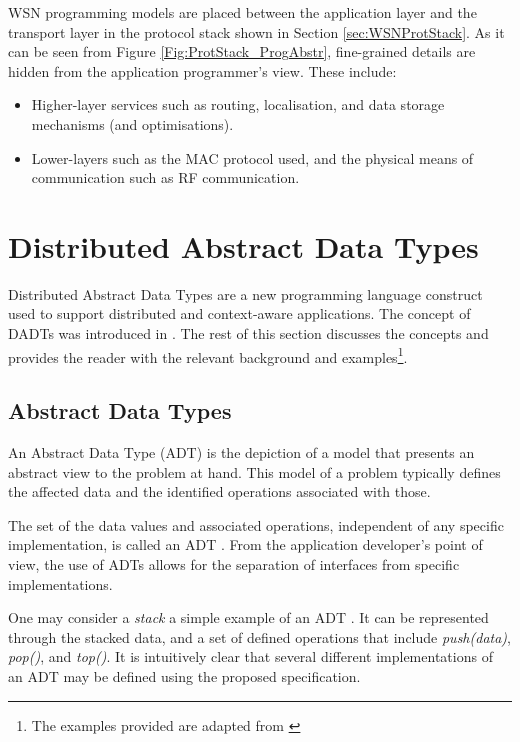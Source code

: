WSN programming models are placed between the application layer and the
transport layer in the
protocol stack shown in Section \ref{sec:WSNProtStack}. As it can be seen from
Figure \ref{Fig:ProtStack_ProgAbstr},
fine-grained details are hidden from the application programmer's view. These
include:

\begin{itemize}
  \item Higher-layer services such as routing, localisation, and data storage
  mechanisms (and optimisations).
  \item Lower-layers such as the MAC protocol used, and the physical means of
  communication such as RF communication.
\end{itemize}

\section {Distributed Abstract Data Types} \label{sec:DADT}

Distributed Abstract Data Types are a new programming language construct used to
support distributed and context-aware applications. The concept of DADTs was
introduced in \cite{migliavacca_DADT:2006}. 
The rest of this section discusses the concepts and provides the reader with
the relevant background and examples\footnote{The examples provided are
adapted from \cite{migliavacca_DADT:2006}}.

\subsection{Abstract Data Types}

An Abstract Data Type (ADT) is the depiction of a model that
presents an abstract view to the problem at hand. This model of a problem
typically defines the affected data and the identified operations associated with
those.

The set of the data values and associated operations, independent of any
specific implementation, is called an ADT \cite{NIST_website}. From the
application developer's point of view, the use of ADTs allows for the separation of
interfaces from specific implementations.

One may consider a \emph{stack} a simple example of an ADT \cite{guttag_ADTs:1977}. It
can be represented through the stacked data, and a set of defined
operations that include \emph{push(data)}, \emph{pop()}, and \emph{top()}. It is intuitively clear that
several different implementations of an ADT may be defined using the proposed specification.

